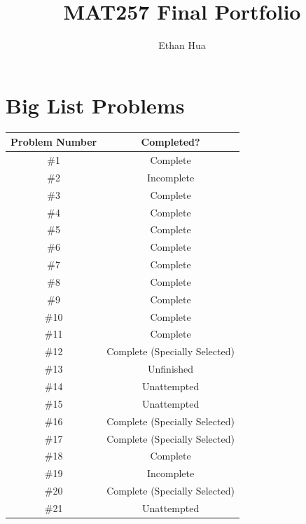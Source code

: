 \documentclass{article}
\title{MAT257 Final Portfolio}
\author{Ethan Hua}
\date{}
\theoremstyle{plain} %
\numberwithin{thm}{section} %
\theoremstyle{definition}
\begin{document}
    \maketitle
    \newpage
    \tableofcontents
    \section{Big List Problems}
    \begin{center}
        \begin{tabular}{ | c | c |}
            \hline
            \textbf{Problem Number} & \textbf{Completed?} \\
            \hline
            \#1 & Complete \\
            \hline
            \#2 & Incomplete \\
            \hline
            \#3 & Complete \\
            \hline
            \#4 & Complete \\
            \hline
            \#5 & Complete \\
            \hline
            \#6 & Complete \\
            \hline
            \#7 & Complete \\
            \hline
            \#8 & Complete \\
            \hline
            \#9 & Complete \\
            \hline
            \#10 & Complete \\
            \hline
            \#11 & Complete \\
            \hline
            \#12 & Complete (Specially Selected) \\
            \hline
            \#13 & Unfinished \\
            \hline
            \#14 & Unattempted \\
            \hline
            \#15 & Unattempted \\
            \hline
            \#16 & Complete (Specially Selected) \\
            \hline
            \#17 & Complete (Specially Selected) \\
            \hline
            \#18 & Complete \\
            \hline
            \#19 & Incomplete \\
            \hline
            \#20 & Complete (Specially Selected) \\
            \hline
            \#21 & Unattempted \\

\end{tabular}
\end{center}
\end{document}
